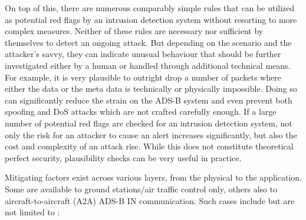 \documentclass[english]{IEEEtran}
\begin{document}
On top of this, there are numerous comparably simple rules that can
be utilized as potential red flags by an intrusion detection system
without resorting to more complex measures. Neither of these rules
are necessary nor sufficient by themselves to detect an ongoing attack.
But depending on the scenario and the attacker's savvy, they can indicate
unusual behaviour that should be further investigated either by a
human or handled through additional technical means. For example,
it is very plausible to outright drop a number of packets where either
the data or the meta data is technically or physically impossible.
Doing so can significantly reduce the strain on the ADS-B system and
even prevent both spoofing and DoS attacks which are not crafted carefully
enough. If a large number of potential red flags are checked for an
intrusion detection system, not only the risk for an attacker to cause
an alert increases significantly, but also the cost and complexity
of an attack rise. While this does not constitute theoretical perfect
security, plausibility checks can be very useful in practice. 

Mitigating factors exist across various layers, from the physical
to the application. Some are available to ground stations/air traffic
control only, others also to aircraft-to-aircraft (A2A) ADS-B IN communication.
Such cases include but are not limited to \cite{Leinmuller2006}:\\
\end{document}
